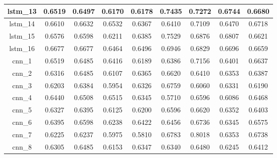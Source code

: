 \begin{table}[h]
\begin{tabular} {|c|c|c|c|c|c|c|c|c| }
        lstm\_13 & 0.6519                        & 0.6497                         & 0.6170                      & 0.6178                  & 0.7435 & 0.7272 & 0.6744 & 0.6680 \\ \hline
        lstm\_14 & 0.6610                        & 0.6632                         & 0.6532                      & 0.6367                  & 0.6410 & 0.7109 & 0.6470 & 0.6718 \\ \hline
        lstm\_15 & 0.6576                        & 0.6598                         & 0.6211                      & 0.6385                  & 0.7529 & 0.6876 & 0.6807 & 0.6621 \\ \hline
        lstm\_16 & 0.6677                        & 0.6677                         & 0.6464                      & 0.6496                  & 0.6946 & 0.6829 & 0.6696 & 0.6659 \\ \hline
        cnn\_1   & 0.6519                        & 0.6485                         & 0.6416                      & 0.6189                  & 0.6386 & 0.7156 & 0.6401 & 0.6637 \\ \hline
        cnn\_2   & 0.6316                        & 0.6485                         & 0.6107                      & 0.6365                  & 0.6620 & 0.6410 & 0.6353 & 0.6387 \\ \hline
        cnn\_3   & 0.6203                        & 0.6384                         & 0.5954                      & 0.6326                  & 0.6759 & 0.6060 & 0.6331 & 0.6190 \\ \hline
        cnn\_4   & 0.6440                        & 0.6508                         & 0.6515                      & 0.6345                  & 0.5710 & 0.6596 & 0.6086 & 0.6468 \\ \hline
        cnn\_5   & 0.6327                        & 0.6395                         & 0.6125                      & 0.6200                  & 0.6596 & 0.6620 & 0.6352 & 0.6403 \\ \hline
        cnn\_6   & 0.6395                        & 0.6598                         & 0.6238                      & 0.6422                  & 0.6456 & 0.6736 & 0.6345 & 0.6575 \\ \hline
        cnn\_7   & 0.6225                        & 0.6237                         & 0.5975                      & 0.5810                  & 0.6783 & 0.8018 & 0.6353 & 0.6738 \\ \hline
        cnn\_8   & 0.6305                        & 0.6485                         & 0.6153                      & 0.6347                  & 0.6340 & 0.6480 & 0.6245 & 0.6412 \\ \hline

\end{tabular}
\end{table}
